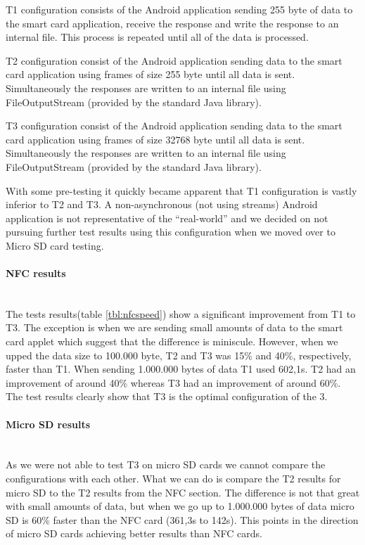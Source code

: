 T1 configuration consists of the Android application sending 255 byte of data to the smart card application, receive the response and write the response to an internal file. This process is repeated until all of the data is processed.

T2 configuration consist of the Android application sending data to the smart card application using frames of size 255 byte until all data is sent. Simultaneously the responses are written to an internal file using FileOutputStream (provided by the standard Java library).

T3 configuration consist of the Android application sending data to the smart card application using frames of size 32768 byte until all data is sent. Simultaneously the responses are written to an internal file using FileOutputStream (provided by the standard Java library).

With some pre-testing it quickly became apparent that T1 configuration is vastly inferior to T2 and T3. A non-asynchronous (not using streams) Android application is not representative of the ``real-world'' and we decided on not pursuing further test results using this configuration when we moved over to Micro SD card testing.

\paragraph{NFC results}\mbox{}\\



The tests results(table \ref{tbl:nfcspeed}) show a significant improvement from T1 to T3. The exception is when we are sending small amounts of data to the smart card applet which suggest that the difference is miniscule. However, when we upped the data size to 100.000 byte, T2 and T3 was 15\% and 40\%, respectively, faster than T1. When sending 1.000.000 bytes of data T1 used 602,1s. T2 had an improvement of around 40\% whereas T3 had an improvement of around 60\%. The test results clearly show that T3 is the optimal configuration of the 3.

\newpage
\paragraph{Micro SD results}\mbox{}\\

As we were not able to test T3 on micro SD cards we cannot compare the configurations with each other. What we can do is compare the T2 results for micro SD to the T2 results from the NFC section. The difference is not that great with small amounts of data, but when we go up to 1.000.000 bytes of data micro SD is 60\% faster than the NFC card (361,3s to 142s). This points in the direction of micro SD cards achieving better results than NFC cards.

